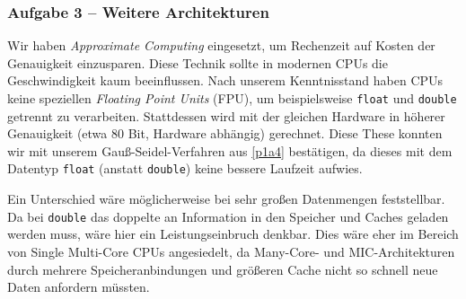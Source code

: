 \documentclass[german,notes,18pt]{beamer}
\begin{document}
	\begin{frame}
		\frametitle{Aufgabe 3 -- Weitere Architekturen}
		Wir haben \emph{Approximate Computing} eingesetzt, um Rechenzeit auf Kosten der Genauigkeit einzusparen.
		Diese Technik sollte in modernen CPUs die Geschwindigkeit kaum beeinflussen. Nach unserem Kenntnisstand haben CPUs keine speziellen \emph{Floating Point Units} (FPU), um beispielsweise \texttt{float} und \texttt{double} getrennt zu verarbeiten. Stattdessen wird mit der gleichen Hardware in höherer Genauigkeit (etwa 80 Bit, Hardware abhängig) gerechnet.
		Diese These konnten wir mit unserem Gauß-Seidel-Verfahren aus \ref{p1a4} bestätigen, da dieses mit dem Datentyp \texttt{float} (anstatt \texttt{double}) keine bessere Laufzeit aufwies.
		
		Ein Unterschied wäre möglicherweise bei sehr großen Datenmengen feststellbar. Da bei \texttt{double} das doppelte an Information in den Speicher und Caches geladen werden muss, wäre hier ein Leistungseinbruch denkbar. Dies wäre eher im Bereich von Single Multi-Core CPUs angesiedelt, da Many-Core- und MIC-Architekturen durch mehrere Speicheranbindungen und größeren Cache nicht so schnell neue Daten anfordern müssten.
	\end{frame}
\end{document}
